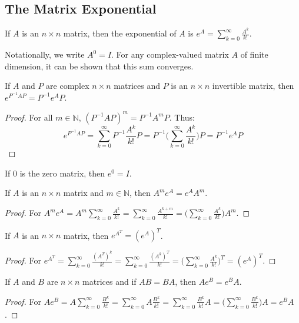 \documentclass[../main.tex]{subfiles}
\begin{document}
\subsection{The Matrix Exponential}
%
\begin{definition}
If $A$ is an $n\times n$ matrix, then the exponential of $A$ is $e^{A} =\sum_{k=0}^{\infty} \frac{A^k}{k!}$.
\end{definition}
%
\begin{remark}
Notationally, we write $A^0 = I$. For any complex-valued matrix $A$ of finite dimension, it can be shown that this sum converges.
\end{remark}
%
\begin{theorem}
If $A$ and $P$ are complex $n\times n$ matrices and $P$ is an $n\times n$ invertible matrix, then $e^{P^{-1}AP} = P^{-1}e^{A}P$.
\end{theorem}
\begin{proof}
For all $m\in \mathbb{N}$, $(P^{-1}AP)^{m} = P^{-1}A^mP$. Thus:
\begin{equation*}
    e^{P^{-1}AP} = \sum_{k=0}^{\infty} P^{-1}\frac{A^k}{k!}P = P^{-1}\big(\sum_{k=0}^{\infty} \frac{A^k}{k!}\big)P = P^{-1}e^A P
\end{equation*}
\end{proof}
%
\begin{theorem}
If $0$ is the zero matrix, then $e^0 = I$.
\end{theorem}
%
\begin{theorem}
If $A$ is an $n\times n$ matrix and $m\in \mathbb{N}$, then $A^{m} e^{A} = e^{A} A^{m}$.
\end{theorem}
\begin{proof}
For $A^{m} e^{A} = A^{m} \sum_{k=0}^{\infty} \frac{A^{k}}{k!} = \sum_{k=0}^{\infty} \frac{A^{k+m}}{k!} = \big(\sum_{k=0}^{\infty} \frac{A^k}{k!}\big)A^{m}$.
\end{proof}
%
\begin{theorem}
If $A$ is an $n\times n$ matrix, then $e^{A^{T}} = (e^{A})^{T}$.
\end{theorem}
\begin{proof}
For $e^{A^{T}} = \sum_{k=0}^{\infty} \frac{(A^{T})^{k}}{k!} = \sum_{k=0}^{\infty} \frac{(A^{k})^{T}}{k!} = \big(\sum_{k=0}^{\infty} \frac{A^{k}}{k!}\big)^{T} = (e^{A})^{T}$.
\end{proof}
%
\begin{theorem}
If $A$ and $B$ are $n\times n$ matrices and if $AB = BA$, then $Ae^{B} = e^{B} A$.
\end{theorem}
\begin{proof}
For $Ae^{B} = A\sum_{k=0}^{\infty} \frac{B^{k}}{k!} = \sum_{k=0}^{\infty} A\frac{B^{k}}{k!} = \sum_{k=0}^{\infty} \frac{B^{k}}{k!}A = \big(\sum_{k=0}^{\infty} \frac{B^{k}}{k!}\big)A = e^{B}A$.
\end{proof}
\end{document}
